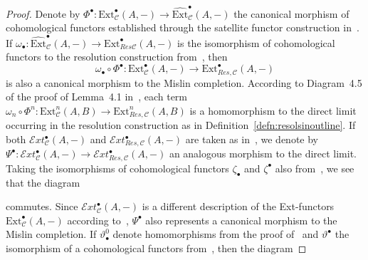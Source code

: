 \documentclass[12pt, a4paper]{article}
\numberwithin{equation}{section}
\theoremstyle{empty}
\theoremstyle{nonumberplain}
\newtheorem{proof}{Proof}
\begin{document}
\begin{proof}
Denote by $\Phi^{\bullet}: \mathrm{Ext}_{\mathcal{C}}^{\bullet}(A, -) \rightarrow \widehat{\mathrm{Ext}}_{\mathcal{C}}^{\bullet}(A, -)$ the canonical morphism of cohomological functors established through the satellite functor construction in~\cite[Theorem~3.2]{ghe24}. If $\omega_{\bullet}: \widehat{\mathrm{Ext}}_{\mathcal{C}}^{\bullet}(A, -) \rightarrow \mathrm{Ext}_{Res\mathcal{C}}^{\bullet}(A, -)$ is the isomorphism of cohomological functors to the resolution construction from~\cite[Theorem~4.6]{ghe24}, then
\[ \omega_{\bullet} \circ \Phi^{\bullet}: \mathrm{Ext}_{\mathcal{C}}^{\bullet}(A, -) \rightarrow \mathrm{Ext}_{Res, \mathcal{C}}^{\bullet}(A, -) \]
is also a canonical morphism to the Mislin completion. According to Diagram~4.5 of the proof of Lemma~4.1 in~\cite{ghe24}, each term $\omega_n \circ \Phi^n: \mathrm{Ext}_{\mathcal{C}}^n(A, B) \rightarrow \mathrm{Ext}_{Res, \mathcal{C}}^n(A, B)$ is a homomorphism to the direct limit occurring in the resolution construction as in Definition~\ref{defn:resolsinoutline}. If both $\mathcal{E}xt_{\mathcal{C}}^{\bullet}(A, -)$ and $\mathcal{E}xt_{Res, \mathcal{C}}^{\bullet}(A, -)$ are taken as in~\cite[Definition~6.9]{ghe24}, we denote by $\Psi^{\bullet}: \mathcal{E}xt_{\mathcal{C}}^{\bullet}(A, -) \rightarrow \mathcal{E}xt_{Res, \mathcal{C}}^{\bullet}(A, -)$ an analogous morphism to the direct limit. Taking the isomorphisms of cohomological functors $\zeta_{\bullet}$ and $\zeta^{\bullet}$ also from~\cite[Definition~6.9]{ghe24}, we see that the diagram
\begin{center}
\end{center}
commutes. Since $\mathcal{E}xt_{\mathcal{C}}^{\bullet}(A, -)$ is a different description of the Ext-functors $\mathrm{Ext}_{\mathcal{C}}^{\bullet}(A, -)$ according to~\cite[Notation~6.1]{ghe24}, $\Psi^{\bullet}$ also represents a canonical morphism to the Mislin completion. If $\vartheta_{\bullet}^0$ denote homomorphisms from the proof of~\cite[Lemma~6.12]{ghe24} and $\vartheta^{\bullet}$ the isomorphism of a cohomological functors from~\cite[Lemma~6.16]{ghe24}, then the diagram

\end{proof}
\end{document}
